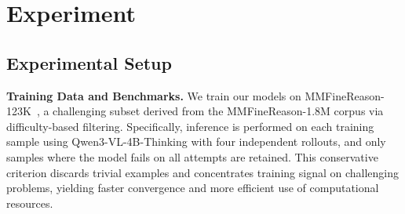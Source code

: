 \documentclass[]{jingdong}
\begin{document}

 
 
\section{Experiment}
\label{sec:exp}

\subsection{Experimental Setup}


\noindent \textbf{Training Data and Benchmarks.}
We train our models on MMFineReason-123K~\citep{lin2026mmfinereasonclosingmultimodalreasoning}, a challenging subset derived from the MMFineReason-1.8M corpus via difficulty-based filtering. Specifically, inference is performed on each training sample using Qwen3-VL-4B-Thinking with four independent rollouts, and only samples where the model fails on all attempts are retained. This conservative criterion discards trivial examples and concentrates training signal on challenging problems, yielding faster convergence and more efficient use of computational resources.
\end{document}
